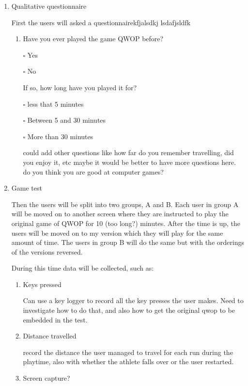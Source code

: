 \documentclass[12pt,a4paper,twoside]{article}
\begin{document}
\begin{enumerate}
	\item Qualitative questionnaire

	First the users will asked a questionnaire{}kfjalsdkj lsdafjsldfk 

	\begin{enumerate}
		\item Have you ever played the game QWOP before?

		$\square$ Yes

		$\square$ No

		If so, how long have you played it for?

		$\square$ less that 5 minutes

		$\square$ Between 5 and 30 minutes

		$\square$ More than 30 minutes

		could add other questions like how far do you remember travelling, did you enjoy it, etc
		maybe it would be better to have more questions here. do you think you are good at computer games?

	\end{enumerate}

	\item Game test

	Then the users will be split into two groups, A and B. Each user in group A will be moved on to another screen where they are instructed to play the original game of QWOP for 10 (too long?) minutes. After the time is up, the users will be moved on to my version which they will play for the same amount of time. The users in group B will do the same but with the orderings of the versions reversed.

	During this time data will be collected, such as:

	\begin{enumerate}
		\item Keys pressed

		Can use a key logger to record all the key presses the user makes. 
		Need to investigate how to do that, and also how to get the original qwop to be embedded in the test.
		\item Distance travelled 

		record the distance the user managed to travel for each run during the playtime, also with whether the athlete falls over or the user restarted.
		\item Screen capture?


\end{enumerate}
\end{enumerate}
\end{document}
